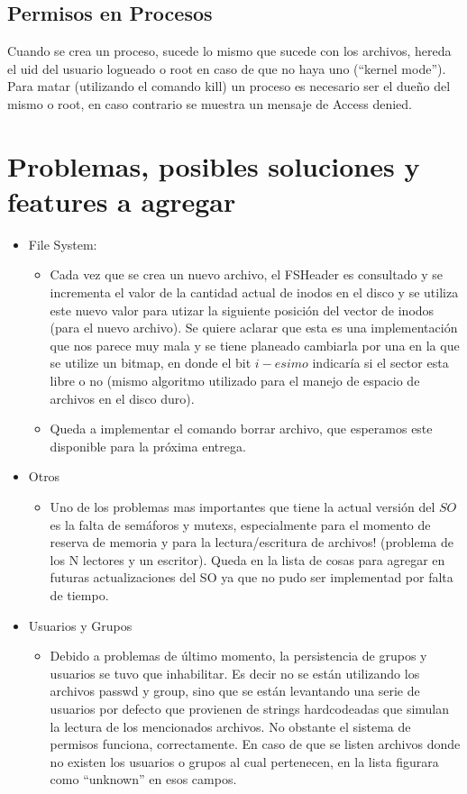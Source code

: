 \documentclass[english]{article}
\begin{document}
\subsection {Permisos en Procesos}
Cuando se crea un proceso, sucede lo mismo que sucede con los archivos, hereda el uid del usuario logueado o root en caso de que no haya uno (“kernel mode”).
Para matar (utilizando el comando kill) un proceso es necesario ser el dueño del mismo o root, en caso contrario se muestra un mensaje de Access denied.
 
\pagebreak{}

\section{Problemas, posibles soluciones y features a agregar}
\begin{itemize}
\item File System:

\begin{itemize}
\item Cada vez que se crea un nuevo archivo, el FSHeader es consultado y
se incrementa el valor de la cantidad actual de inodos en el disco
y se utiliza este nuevo valor para utizar la siguiente posición del
vector de inodos (para el nuevo archivo). Se quiere aclarar que esta
es una implementación que nos parece muy mala y se tiene planeado
cambiarla por una en la que se utilize un bitmap, en donde el bit
$i-esimo$ indicaría si el sector esta libre o no (mismo algoritmo
utilizado para el manejo de espacio de archivos en el disco duro). 
\item Queda a implementar el comando borrar archivo, que esperamos este disponible
para la próxima entrega.
\end{itemize}
\item Otros

\begin{itemize}
\item Uno de los problemas mas importantes que tiene la actual versión del
$SO$ es la falta de semáforos y mutexs, especialmente para el momento
de reserva de memoria y para la lectura/escritura de archivos! (problema
de los N lectores y un escritor). Queda en la lista de cosas para
agregar en futuras actualizaciones del SO ya que no pudo ser implementad
por falta de tiempo.
\end{itemize}

\item Usuarios y Grupos
\begin{itemize}
\item Debido a problemas de último momento, la persistencia de grupos y usuarios se tuvo que inhabilitar. Es decir no se están utilizando los archivos passwd y group, sino que se están levantando una serie de usuarios por defecto que provienen de strings hardcodeadas que simulan la lectura de los mencionados archivos. No obstante el sistema de permisos funciona, correctamente. En caso de que se listen archivos donde no existen los usuarios o grupos al cual pertenecen, en la lista figurara como “unknown” en esos campos.
\end{itemize}

\end{itemize}
\end{document}
